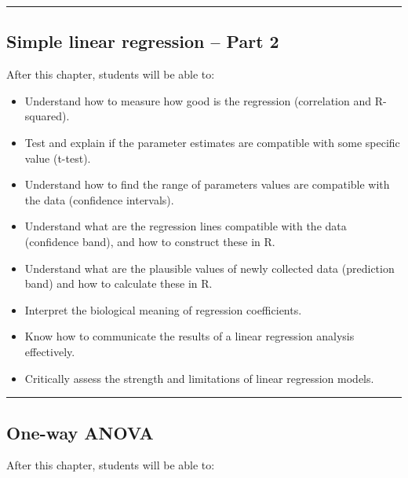 \documentclass[
  letterpaper,
  8pt,
  a4paper]{book}
\providecommand{\tightlist}{%
  \setlength{\itemsep}{0pt}\setlength{\parskip}{0pt}}
\begin{document}
\begin{center}\rule{0.5\linewidth}{0.5pt}\end{center}

\subsection*{Simple linear regression -- Part
2}\label{simple-linear-regression-part-2}

After this chapter, students will be able to:

\begin{itemize}
\tightlist
\item
  Understand how to measure how good is the regression (correlation and
  R-squared).
\item
  Test and explain if the parameter estimates are compatible with some
  specific value (t-test).
\item
  Understand how to find the range of parameters values are compatible
  with the data (confidence intervals).
\item
  Understand what are the regression lines compatible with the data
  (confidence band), and how to construct these in R.
\item
  Understand what are the plausible values of newly collected data
  (prediction band) and how to calculate these in R.
\item
  Interpret the biological meaning of regression coefficients.
\item
  Know how to communicate the results of a linear regression analysis
  effectively.
\item
  Critically assess the strength and limitations of linear regression
  models.
\end{itemize}

\begin{center}\rule{0.5\linewidth}{0.5pt}\end{center}

\subsection*{One-way ANOVA}\label{one-way-anova}

After this chapter, students will be able to:
\end{document}
